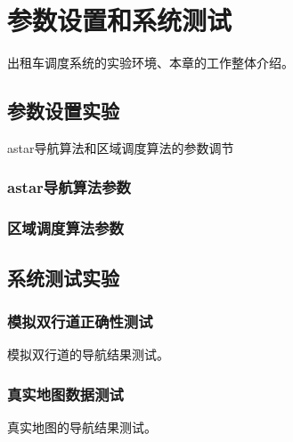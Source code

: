 \chapter{参数设置和系统测试}
出租车调度系统的实验环境、本章的工作整体介绍。
\section{参数设置实验}
astar导航算法和区域调度算法的参数调节
\subsection{astar导航算法参数}
\subsection{区域调度算法参数}

\section{系统测试实验}

\subsection{模拟双行道正确性测试}
模拟双行道的导航结果测试。
\subsection{真实地图数据测试}
真实地图的导航结果测试。